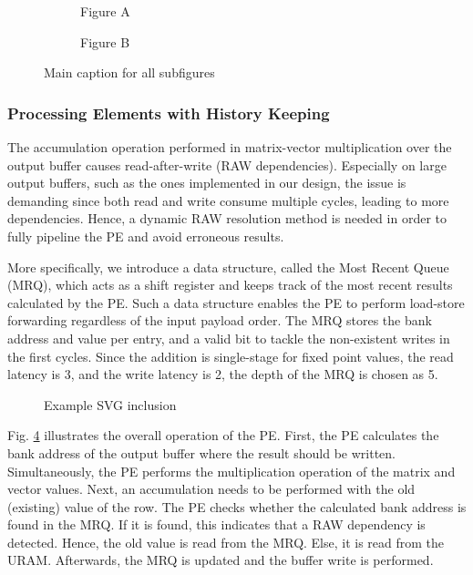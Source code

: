 \documentclass[manuscript,screen,review]{acmart}
\begin{document}
\begin{figure}[h]
	\centering
	\begin{subfigure}[b]{0.5\textwidth}
		\centering
		
		\caption{Figure A}
		\label{fig:matrix-partition}
	\end{subfigure}
	\hspace{1em} %
	\begin{subfigure}[b]{0.45\textwidth}
		\centering
		
		\caption{Figure B}
		\label{fig:packets-channels}
	\end{subfigure}
	\caption{Main caption for all subfigures}
	\label{fig:vector-unit}
\end{figure}

\subsubsection{Processing Elements with History Keeping}
The accumulation operation performed in matrix-vector multiplication over the output buffer causes read-after-write (RAW dependencies). Especially on large output buffers, such as the ones implemented in our design, the issue is demanding since both read and write consume multiple cycles, leading to more dependencies. Hence, a dynamic RAW resolution method is needed in order to fully pipeline the PE and avoid erroneous results. 

More specifically, we introduce a data structure, called the Most Recent Queue (MRQ), which acts as a shift register and keeps track of the most recent results calculated by the PE. Such a data structure enables the PE to perform load-store forwarding \cite{hisparse,graphlily} regardless of the input payload order. The MRQ stores the bank address and value per entry, and a valid bit to tackle the non-existent writes in the first cycles. Since the addition is single-stage for fixed point values, the read latency is 3, and the write latency is 2, the depth of the MRQ is chosen as 5.

\begin{figure}[h]
	\centering
	
	\caption{Example SVG inclusion}
	\label{fig:pe}
\end{figure}

Fig. \ref{fig:pe} illustrates the overall operation of the PE. First, the PE calculates the bank address of the output buffer where the result should be written. Simultaneously, the PE performs the multiplication operation of the matrix and vector values. Next, an accumulation needs to be performed with the old (existing) value of the row. The PE checks whether the calculated bank address is found in the MRQ. If it is found, this indicates that a RAW dependency is detected. Hence, the old value is read from the MRQ. Else, it is read from the URAM. Afterwards, the MRQ is updated and the buffer write is performed. 
\end{document}
